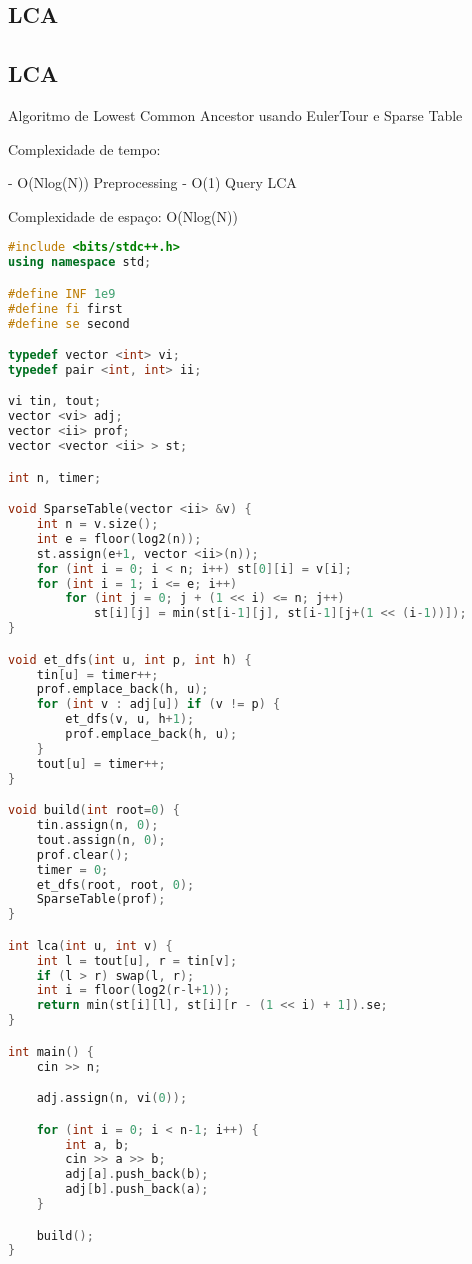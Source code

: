 \documentclass[11pt, a4paper, twoside]{article}
\begin{document}
\subsection{LCA}

\subsection{LCA}


Algoritmo de Lowest Common Ancestor usando EulerTour e Sparse Table

Complexidade de tempo:

- O(Nlog(N)) Preprocessing
- O(1) Query LCA

Complexidade de espaço: O(Nlog(N))

\begin{lstlisting}[language=C++]
#include <bits/stdc++.h>
using namespace std;

#define INF 1e9
#define fi first
#define se second

typedef vector <int> vi;
typedef pair <int, int> ii;

vi tin, tout;
vector <vi> adj;
vector <ii> prof;
vector <vector <ii> > st;

int n, timer;

void SparseTable(vector <ii> &v) {
    int n = v.size();
    int e = floor(log2(n));
    st.assign(e+1, vector <ii>(n));
    for (int i = 0; i < n; i++) st[0][i] = v[i];
    for (int i = 1; i <= e; i++)
        for (int j = 0; j + (1 << i) <= n; j++)
            st[i][j] = min(st[i-1][j], st[i-1][j+(1 << (i-1))]);
}

void et_dfs(int u, int p, int h) {
    tin[u] = timer++;
    prof.emplace_back(h, u);
    for (int v : adj[u]) if (v != p) {
        et_dfs(v, u, h+1);
        prof.emplace_back(h, u);
    }
    tout[u] = timer++;
}

void build(int root=0) {
    tin.assign(n, 0);
    tout.assign(n, 0);
    prof.clear();
    timer = 0;
    et_dfs(root, root, 0);
    SparseTable(prof);
}

int lca(int u, int v) {
    int l = tout[u], r = tin[v];
    if (l > r) swap(l, r);
    int i = floor(log2(r-l+1));
    return min(st[i][l], st[i][r - (1 << i) + 1]).se;
}

int main() {
    cin >> n;

    adj.assign(n, vi(0));

    for (int i = 0; i < n-1; i++) {
        int a, b;
        cin >> a >> b;
        adj[a].push_back(b);
        adj[b].push_back(a);
    }

    build();
}
\end{lstlisting}
\end{document}

